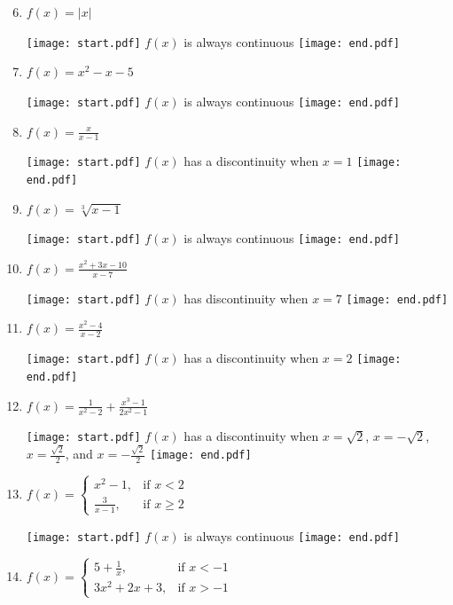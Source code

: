 \documentclass[12pt]{article}
\begin{document}
\begin{enumerate}
\setcounter{enumi}{5}

\item $f(x) = |x|$ 

\texttt{[image: start.pdf]}
{{$f(x)$ is always continuous}}
\texttt{[image: end.pdf]}


\item $f(x) = x^2 -x -5$

\texttt{[image: start.pdf]}
{{$f(x)$ is always continuous}}
\texttt{[image: end.pdf]}


\item $f(x) = \frac{x}{x-1}$ 

\texttt{[image: start.pdf]}
{{$f(x)$ has a discontinuity when $x=1$}}
\texttt{[image: end.pdf]}


\item $f(x) = \sqrt[3]{x-1}$ 

\texttt{[image: start.pdf]}
{{$f(x)$  is always continuous}}
\texttt{[image: end.pdf]}


\item $f(x) = \frac{x^2+3x-10}{x-7}$ 

\texttt{[image: start.pdf]}
{{$f(x)$ has discontinuity when $x=7$}}
\texttt{[image: end.pdf]}


\item $f(x) = \frac{x^2-4}{x-2}$ 

\texttt{[image: start.pdf]}
{{$f(x)$ has a discontinuity when $x=2$}}
\texttt{[image: end.pdf]}


\item$f(x) = \frac{1}{x^2-2}+\frac{x^3-1}{2x^2-1}$ 

\texttt{[image: start.pdf]}
{{$f(x)$ has a discontinuity when $x=\sqrt{2}$, $x=-\sqrt{2}$, $\displaystyle x=\frac{\sqrt{2}}{2}$, and $\displaystyle x=-\frac{\sqrt{2}}{2}$}}
\texttt{[image: end.pdf]}


\item $f(x) = \begin{cases} 
x^2-1, & \text{if } x<2 \\
\frac{3}{x-1}, & \text{if } x\geq 2\end{cases}$ 

\texttt{[image: start.pdf]}
{{$f(x)$ is always continuous}}
\texttt{[image: end.pdf]}


\item $f(x) = \begin{cases} 
5+\frac{1}{x}, & \text{if } x<- 1 \\
3x^2+2x+3, & \text{if } x> -1\end{cases} $ 


\end{enumerate}
\end{document}
